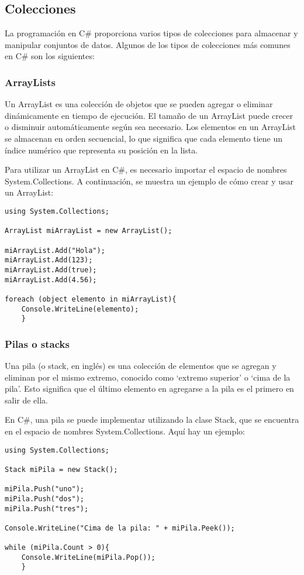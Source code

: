 \documentclass[executivepaper]{article}
\begin{document}
\subsection{Colecciones}

La programación en C\# proporciona varios tipos de colecciones para almacenar y manipular conjuntos de datos. Algunos de los tipos de colecciones más comunes en C\# son los siguientes:

\subsubsection*{ArrayLists}
Un ArrayList es una colección de objetos que se pueden agregar o eliminar dinámicamente en tiempo de ejecución. El tamaño de un ArrayList puede crecer o disminuir automáticamente según sea necesario. Los elementos en un ArrayList se almacenan en orden secuencial, lo que significa que cada elemento tiene un índice numérico que representa su posición en la lista.

Para utilizar un ArrayList en C\#, es necesario importar el espacio de nombres System.Collections. A continuación, se muestra un ejemplo de cómo crear y usar un ArrayList:

\begin{lstlisting}
using System.Collections;

ArrayList miArrayList = new ArrayList();

miArrayList.Add("Hola");
miArrayList.Add(123);
miArrayList.Add(true);
miArrayList.Add(4.56);

foreach (object elemento in miArrayList){
    Console.WriteLine(elemento);
    }
\end{lstlisting}

\subsubsection*{Pilas o stacks}
Una pila (o stack, en inglés) es una colección de elementos que se agregan y eliminan por el mismo extremo, conocido como \enquote*{extremo superior} o \enquote*{cima de la pila}. Esto significa que el último elemento en agregarse a la pila es el primero en salir de ella.

En C\#, una pila se puede implementar utilizando la clase Stack, que se encuentra en el espacio de nombres System.Collections. Aquí hay un ejemplo:

\begin{lstlisting}
using System.Collections;

Stack miPila = new Stack();

miPila.Push("uno");
miPila.Push("dos");
miPila.Push("tres");

Console.WriteLine("Cima de la pila: " + miPila.Peek());

while (miPila.Count > 0){
    Console.WriteLine(miPila.Pop());
    }
\end{lstlisting}
\end{document}
